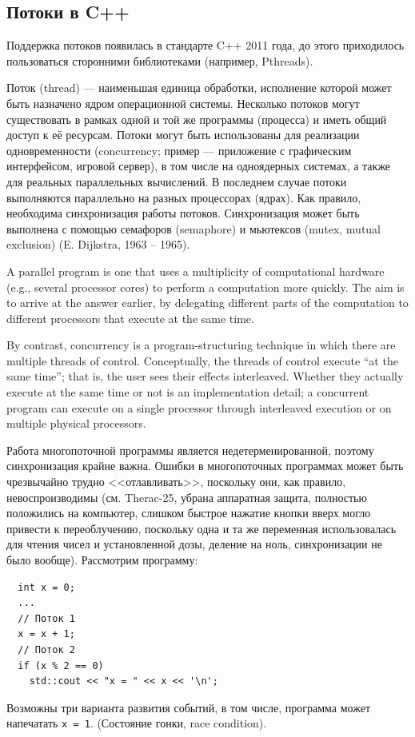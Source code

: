 \documentclass{book}
\begin{document}
\subsection{Потоки в C++}

Поддержка потоков появилась в стандарте C++ 2011 года, до этого приходилось
пользоваться сторонними библиотеками (например, Pthreads).

Поток (thread) --- наименьшая единица обработки, исполнение которой может быть
назначено ядром операционной системы. Несколько потоков могут существовать в
рамках одной и той же программы (процесса) и иметь общий доступ к её ресурсам.
Потоки могут быть использованы для реализации одновременности (concurrency;
пример --- приложение с графическим интерфейсом, игровой сервер), в том числе на одноядерных
системах, а также для реальных параллельных вычислений. В последнем случае
потоки выполняются параллельно на разных процессорах (ядрах). Как правило,
необходима синхронизация работы потоков. Синхронизация может быть выполнена с
помощью семафоров (semaphore) и мьютексов (mutex, mutual exclusion) (E.
Dijkstra, 1963 -- 1965).

A parallel program is one that uses a multiplicity of computational hardware (e.g., several
processor cores) to perform a computation more quickly. The aim is to arrive at the answer earlier,
by delegating different parts of the computation to different processors that execute at the same
time.

By contrast, concurrency is a program-structuring technique in which there are multiple threads of
control. Conceptually, the threads of control execute “at the same time”; that is, the user sees
their effects interleaved. Whether they actually execute at the same time or not is an
implementation detail; a concurrent program can execute on a single processor through interleaved
execution or on multiple physical processors.

Работа многопоточной программы является недетерменированной, поэтому
синхронизация крайне важна. Ошибки в многопоточных программах может быть
чрезвычайно трудно <<отлавливать>>, поскольку они, как правило,
невоспроизводимы (см. Therac-25, убрана аппаратная защита, полностью положились на компьютер,
слишком быстрое нажатие кнопки вверх могло привести к переоблучению, поскольку одна и та же
переменная использовалась для чтения чисел и установленной дозы, деление на ноль, синхронизации не
было вообще). Рассмотрим программу:
\begin{verbatim}
  int x = 0;
  ...
  // Поток 1
  x = x + 1;
  // Поток 2
  if (x % 2 == 0)
    std::cout << "x = " << x << '\n';
\end{verbatim}
Возможны три варианта развития событий, в том числе, программа может напечатать 
\texttt{x = 1}. (Состояние гонки, race condition).
\end{document}
